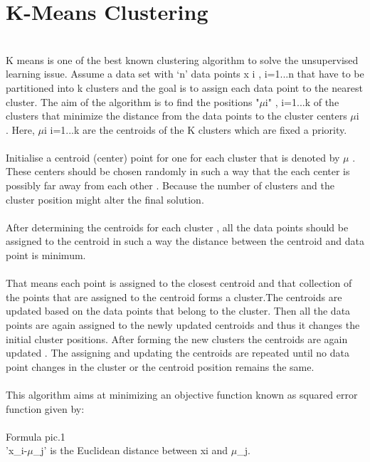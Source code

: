 \documentclass[11pt]{article}
\begin{document}
\section{K-Means Clustering}\\

K means is one of the best known clustering algorithm to solve the unsupervised learning issue. Assume a data set with ‘n’ data points x i , i=1...n that have to be partitioned 
into k clusters and the goal is to assign each data point to the nearest cluster. The aim of the algorithm is to find the positions "$ \mu $i" , i=1...k of the clusters that minimize the 
distance from the data points to the cluster centers $ \mu $i . Here, $ \mu $i i=1...k  are the centroids of the K clusters which are fixed a priority.\\
\\
Initialise a centroid (center) point for one for each cluster that is denoted by $ \mu $ . These centers should be chosen randomly in such a way that the each center is possibly far away from each other . Because the number of clusters 
and the cluster position might alter the final solution.\\
\\
After determining the centroids for each cluster , all the data points should be assigned to the centroid in such a way the 
distance between the centroid and data point is minimum.\\
\\
That means each point is assigned to the closest centroid and that collection of the points that are assigned to the centroid forms
a cluster.The centroids are updated based on the data points that belong to the cluster. Then all the data points are again assigned to the newly updated centroids and thus it changes the
initial cluster positions. After forming the new clusters the centroids are again updated . The assigning and updating the centroids are repeated until no data point changes in the cluster
or the centroid position remains the same.\\
\\
This  algorithm  aims at  minimizing  an objective function known as squared error function given by:\\  

\\
Formula pic.1
\\

'\mid\mid x_i-$ \mu $_j\mid\mid' is the Euclidean distance between xi and $ \mu $_j.\\
\end{document}
